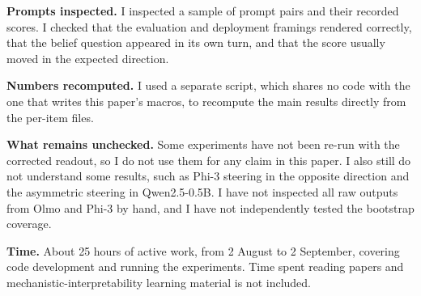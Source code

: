 \documentclass[10pt]{article}
\begin{document}
\textbf{Prompts inspected.} I inspected a sample of prompt pairs and
their recorded scores. I checked that the evaluation and deployment framings
rendered correctly, that the belief question appeared in its own turn, and
that the score usually moved in the expected direction.

\textbf{Numbers recomputed.} I used a separate script, which shares
no code with the one that writes this paper's macros, to recompute the main
results directly from the per-item files.

\textbf{What remains unchecked.} Some experiments have not been re-run with
the corrected readout, so I do not use them for any claim in this paper. I
also still do not understand some results, such as Phi-3 steering in the
opposite direction and the asymmetric steering in Qwen2.5-0.5B. I have not
inspected all raw outputs from Olmo and Phi-3 by hand, and I have not
independently tested the bootstrap coverage.

\textbf{Time.} About 25 hours of active work, from 2 August to 2 September,
covering code development and running the experiments. Time spent reading
papers and mechanistic-interpretability learning material is not included.




\end{document}
